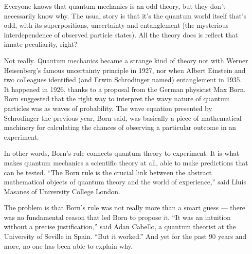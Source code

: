 \documentclass[12pt]{article}
\begin{document}
Everyone knows that quantum mechanics is an odd theory, but they don't necessarily know why. The usual story is that it's the
quantum world itself that's odd, with its superpositions, uncertainty and entanglement (the mysterious interdependence of
observed particle states). All the theory does is reflect that innate peculiarity, right?

Not really. Quantum mechanics became a strange kind of theory not with Werner Heisenberg's famous uncertainty principle in
1927, nor when Albert Einstein and two colleagues identified (and Erwin Schrodinger named) entanglement in 1935. It happened
in 1926, thanks to a proposal from the German physicist Max Born. Born suggested that the right way to interpret the wavy
nature of quantum particles was as waves of probability. The wave equation presented by Schrodinger the previous year, Born
said, was basically a piece of mathematical machinery for calculating the chances of observing a particular outcome in an
experiment.

In other words, Born's rule connects quantum theory to experiment. It is what makes quantum mechanics a scientific theory at
all, able to make predictions that can be tested. ``The Born rule is the crucial link between the abstract mathematical objects of
quantum theory and the world of experience,'' said Lluis Masanes of University College London.

The problem is that Born's rule was not really more than a smart guess --- there was no fundamental reason that led Born to
propose it. ``It was an intuition without a precise justification,'' said Adan Cabello, a quantum theorist at the University of Seville
in Spain. ``But it worked.'' And yet for the past 90 years and more, no one has been able to explain why.
\end{document}
